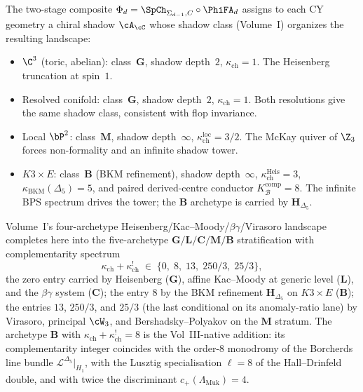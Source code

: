 \begin{remark}
\label{rem:v3-cy-glcm-shadow-classification}
The two-stage composite
$\Phi_d = \SpCh_{\Sigma_{d-1}, C}\circ\PhiFA_d$ assigns to
each CY geometry a chiral shadow $\cA_\cC$ whose shadow
class (Volume~I) organizes the resulting landscape:
\begin{itemize}[leftmargin=1.5em,topsep=0.3ex,itemsep=0.3ex]
 \item $\C^3$ (toric, abelian): class~$\mathbf{G}$, shadow
 depth~$2$, $\kappa_{\mathrm{ch}} = 1$. The Heisenberg
 truncation at spin~$1$.
 \item Resolved conifold: class~$\mathbf{G}$, shadow
 depth~$2$, $\kappa_{\mathrm{ch}} = 1$. Both resolutions
 give the same shadow class, consistent with flop
 invariance.
 \item Local $\bP^2$: class~$\mathbf{M}$, shadow
 depth~$\infty$, $\kappa_{\mathrm{ch}}^{\mathrm{loc}} = 3/2$. The McKay
 quiver of $\Z_3$ forces non-formality and an infinite
 shadow tower.
 \item $K3 \times E$: class~$\mathbf{B}$ (BKM refinement),
 shadow depth~$\infty$, $\kappa_{\mathrm{ch}}^{\mathrm{Heis}} = 3$,
 $\kappa_{\mathrm{BKM}}(\Delta_5) = 5$, and paired derived-centre
 conductor $K_{\mathcal B}^{\mathrm{comp}}=8$. The infinite BPS spectrum
 drives the tower; the $\mathbf{B}$ archetype is carried by
 $\mathbf{H}_{\Delta_5}$.
\end{itemize}
Volume~I's four-archetype Heisenberg/Kac--Moody/$\beta\gamma$/Virasoro
landscape completes here into the five-archetype
$\mathbf{G}/\mathbf{L}/\mathbf{C}/\mathbf{M}/\mathbf{B}$ stratification
with complementarity spectrum
\[
 \kappa_{\mathrm{ch}} + \kappa_{\mathrm{ch}}^!
 \;\in\; \{0,\; 8,\; 13,\; 250/3,\; 25/3\},
\]
the zero entry carried by Heisenberg ($\mathbf{G}$), affine Kac--Moody
at generic level ($\mathbf{L}$), and the $\beta\gamma$ system
($\mathbf{C}$); the entry $8$ by the BKM refinement
$\mathbf{H}_{\Delta_5}$ on $K3\times E$ ($\mathbf{B}$); the entries
$13$, $250/3$, and $25/3$ (the last conditional on its anomaly-ratio
lane) by Virasoro, principal $\cW_3$, and Bershadsky--Polyakov on the
$\mathbf{M}$ stratum.
The archetype $\mathbf{B}$ with
$\kappa_{\mathrm{ch}} + \kappa_{\mathrm{ch}}^! = 8$ is the
Vol~III-native addition: its complementarity integer coincides with
the order-$8$ monodromy of the Borcherds line bundle
$\mathcal L^{\Delta_5}|_{H_1}$, with the Lusztig specialisation
$\ell = 8$ of the Hall--Drinfeld double, and with twice the
discriminant $c_+(\Lambda_{\mathrm{Muk}}) = 4$.

\end{remark}
